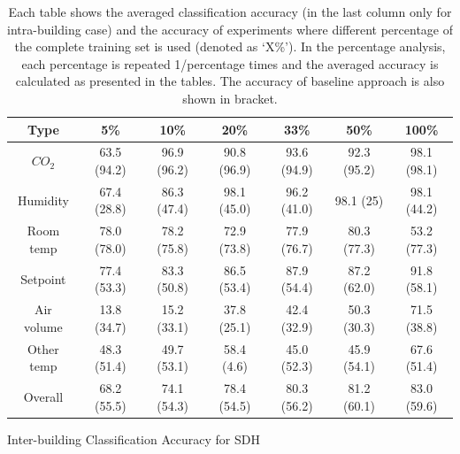 \begin{table}[ht!]
\centering %
\begin{tabular}{c | c | c | c | c | c | c} \hline
Type & 5\% & 10\% & 20\% & 33\% & 50\% & 100\%\\ %
\hline\hline %
$CO_{2}$ & 63.5 (94.2) & 96.9 (96.2) & 90.8 (96.9) & 93.6 (94.9) & 92.3 (95.2) & 98.1 (98.1)\\ \hline
Humidity & 67.4 (28.8) & 86.3 (47.4) & 98.1 (45.0) & 96.2 (41.0) & 98.1 (25) & 98.1 (44.2)\\ \hline
Room temp & 78.0 (78.0) & 78.2 (75.8) & 72.9 (73.8) & 77.9 (76.7) & 80.3 (77.3) & 53.2 (77.3)\\ \hline
Setpoint & 77.4 (53.3) & 83.3 (50.8) & 86.5 (53.4) & 87.9 (54.4) & 87.2 (62.0) & 91.8 (58.1)\\ \hline
Air volume & 13.8 (34.7) & 15.2 (33.1) & 37.8 (25.1) & 42.4 (32.9) & 50.3 (30.3) & 71.5 (38.8)\\ \hline
Other temp & 48.3 (51.4) & 49.7 (53.1) & 58.4 (4.6) & 45.0 (52.3) & 45.9 (54.1) & 67.6 (51.4)\\ \hline
Overall & 68.2 (55.5) & 74.1 (54.3) & 78.4 (54.5) & 80.3 (56.2) & 81.2 (60.1) & 83.0 (59.6)\\ \hline
\end{tabular}
\caption{Inter-building Classification Accuracy for SDH}
\caption*{Each table shows the averaged classification accuracy (in the last column only for intra-building case) and the accuracy of experiments where different percentage of the complete training set is used (denoted as `X\%'). In the percentage analysis, each percentage is repeated 1/percentage times and the averaged accuracy is calculated as presented in the tables. The accuracy of baseline approach is also shown in bracket.}
\label{table:sdh_x} %
\end{table}

